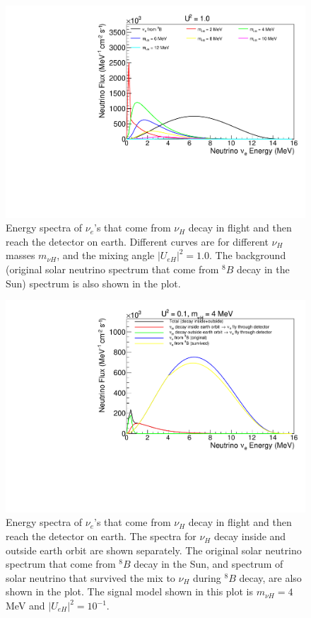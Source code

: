 \documentclass[%
 reprint,
 amsmath,amssymb,
 aps,
 prd,
floatfix,
twocolumn,
]{revtex4-1}
\begin{document}
\begin{figure}[!htbp]
\includegraphics[width=0.99\columnwidth]{../plots/DecayInFlightNuLEnergy_U1.0_AllMass_linXlinY.pdf}
\caption{Energy spectra of $\nu_e$'s that come from $\nu_H$ decay in flight and then reach the detector on earth. Different curves are for different $\nu_H$ masses $m_{\nu H}$, and the mixing angle $|U_{eH}|^2 = 1.0$. 
The background (original solar neutrino spectrum that come from $^8 B$ decay in the Sun) spectrum is also shown in the plot.}
\label{fig:DecayInFlightSpectrum_U1em0_AllMass}
\end{figure}

\clearpage

\begin{figure}[!htbp]
\includegraphics[width=0.99\columnwidth]{../plots/DecayInFlightNuLEnergy_U0.1_M4.0_InsideOutside_linXlinY.pdf}
\caption{Energy spectra of $\nu_e$'s that come from $\nu_H$ decay in flight and then reach the detector on earth. The spectra for $\nu_H$ decay inside and outside earth orbit are shown separately. 
The original solar neutrino spectrum that come from $^8 B$ decay in the Sun, and spectrum of solar neutrino that survived the mix to $\nu_H$ during $^{8}B$ decay, are also shown in the plot. The signal model shown in this plot is $m_{\nu H} = 4$ MeV and $|U_{eH}|^2 = 10^{-1}$.}
\label{fig:DecayInFlightSpectrum_U1em1_M4} 
\end{figure}
\end{document}
